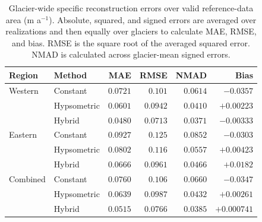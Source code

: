 \begin{table}[!htbp]
\centering\small
\setlength{\tabcolsep}{5pt}
\caption{Glacier-wide specific reconstruction errors over valid reference-data area (m a$^{-1}$). Absolute, squared, and signed errors are averaged over realizations and then equally over glaciers to calculate MAE, RMSE, and bias. RMSE is the square root of the averaged squared error. NMAD is calculated across glacier-mean signed errors.}
\label{tab:glacier}
\begin{tabular}{llrrrr}
\toprule
Region & Method & MAE & RMSE & NMAD & Bias \\
\midrule
Western & Constant & $0.0721$ & $0.101$ & $0.0614$ & $-0.0357$ \\
 & Hypsometric & $0.0601$ & $0.0942$ & $0.0410$ & {\boldmath$+0.00223$} \\
 & Hybrid & {\boldmath$0.0480$} & {\boldmath$0.0713$} & {\boldmath$0.0371$} & $-0.00333$ \\
\midrule
Eastern & Constant & $0.0927$ & $0.125$ & $0.0852$ & $-0.0303$ \\
 & Hypsometric & $0.0802$ & $0.116$ & $0.0557$ & {\boldmath$+0.00423$} \\
 & Hybrid & {\boldmath$0.0666$} & {\boldmath$0.0961$} & {\boldmath$0.0466$} & $+0.0182$ \\
\midrule
Combined & Constant & $0.0760$ & $0.106$ & $0.0660$ & $-0.0347$ \\
 & Hypsometric & $0.0639$ & $0.0987$ & $0.0432$ & $+0.00261$ \\
 & Hybrid & {\boldmath$0.0515$} & {\boldmath$0.0766$} & {\boldmath$0.0385$} & {\boldmath$+0.000741$} \\
\bottomrule
\end{tabular}
\end{table}
